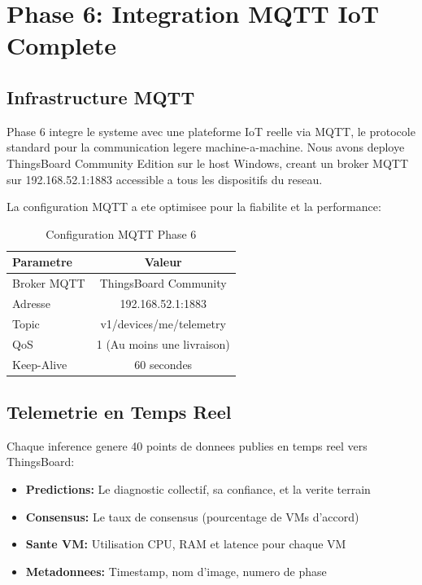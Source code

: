 \documentclass[12pt,a4paper]{report}
\begin{document}
\chapter{Phase 6: Integration MQTT IoT Complete}

\section{Infrastructure MQTT}

Phase 6 integre le systeme avec une plateforme IoT reelle via MQTT, le protocole standard pour la communication legere machine-a-machine. Nous avons deploye ThingsBoard Community Edition sur le host Windows, creant un broker MQTT sur 192.168.52.1:1883 accessible a tous les dispositifs du reseau.

La configuration MQTT a ete optimisee pour la fiabilite et la performance:

\begin{table}[H]
\centering
\begin{tabular}{|l|c|}
\hline
\textbf{Parametre} & \textbf{Valeur} \\
\hline
Broker MQTT & ThingsBoard Community \\
Adresse & 192.168.52.1:1883 \\
Topic & v1/devices/me/telemetry \\
QoS & 1 (Au moins une livraison) \\
Keep-Alive & 60 secondes \\
\hline
\end{tabular}
\caption{Configuration MQTT Phase 6}
\end{table}

\section{Telemetrie en Temps Reel}

Chaque inference genere 40 points de donnees publies en temps reel vers ThingsBoard:

\begin{itemize}
    \item \textbf{Predictions:} Le diagnostic collectif, sa confiance, et la verite terrain
    \item \textbf{Consensus:} Le taux de consensus (pourcentage de VMs d'accord)
    \item \textbf{Sante VM:} Utilisation CPU, RAM et latence pour chaque VM
    \item \textbf{Metadonnees:} Timestamp, nom d'image, numero de phase
\end{itemize}
\end{document}
